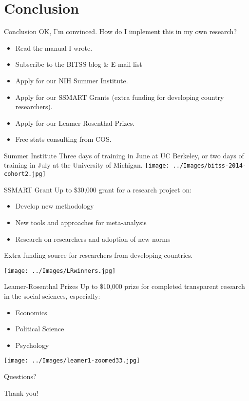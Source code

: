 \documentclass{beamer}
\begin{document}
\section{Conclusion}
\begin{frame}{Conclusion}
OK, I'm convinced. How do I implement this in my own research?

\begin{itemize}[<.->]
\item Read the manual I wrote.\href{https://github.com/garretchristensen/BestPracticesManual}{}
\item Subscribe to the BITSS blog \& E-mail list \href{https://bitss.org/blog}{}
\item Apply for our NIH Summer Institute. \href{http://www.bitss.org/events/summer-institute/}{}
\item Apply for our SSMART Grants (extra funding for developing country researchers). \href{http://www.bitss.org/ssmart-grants/}{}
\item Apply for our Leamer-Rosenthal Prizes. \href{http://www.bitss.org/lr-prizes/}{}
\item Free stats consulting from COS. \href{https://cos.io/stats_consulting/}{}
\end{itemize}
\end{frame}

\begin{frame}{Summer Institute}
Three days of training in June at UC Berkeley, or two days of training in July at the University of Michigan.
\texttt{[image: ../Images/bitss-2014-cohort2.jpg]}
\end{frame}

\begin{frame}{SSMART Grant}
Up to \$30,000 grant for a research project on:
\begin{itemize}[<.->]
\item Develop new methodology
\item New tools and approaches for meta-analysis
\item Research on researchers and adoption of new norms
\end{itemize}
Extra funding source for researchers from developing countries.

\texttt{[image: ../Images/LRwinners.jpg]}
\end{frame}

\begin{frame}{Leamer-Rosenthal Prizes}
Up to \$10,000 prize for completed transparent research in the social sciences,
especially:
\begin{itemize}[<.->]
\item Economics
\item Political Science
\item Psychology
\end{itemize}
\texttt{[image: ../Images/leamer1-zoomed33.jpg]}
\end{frame}


\begin{frame}
\begin{center}
Questions?
\vspace{1in}


\Huge{Thank you!}
\end{center}
\end{frame}
\end{document}
